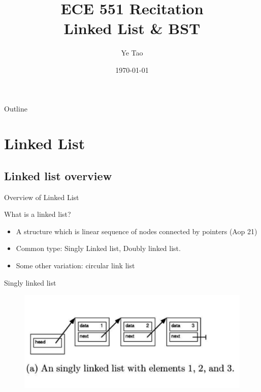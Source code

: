 \documentclass{beamer}
\title[]{ECE 551 Recitation \\ Linked List \& BST}
\author{Ye Tao}
\institute{Adapted from Ian Kaszubski \& George Mappouras}
\date{\today}
\begin{document}
\begin{frame}
  \titlepage
\end{frame}

\begin{frame}{Outline}
  \tableofcontents
\end{frame}

\section{Linked List}
\subsection{Linked list overview}

\begin{frame}{Overview of Linked List}
    \begin{block}{What is a linked list?}
        \begin{itemize}
        \item<2-> A structure which is linear sequence of nodes connected by pointers (Aop 21)
        \item<3-> Common type: Singly Linked list, Doubly linked list.
        \item<4> Some other variation: circular link list 
    \end{itemize}
    \end{block}
\end{frame}

\begin{frame}{Singly linked list}
    \begin{figure}
        \includegraphics[width=\textwidth]{LL1.png}
    \end{figure}
\end{frame}
\end{document}
